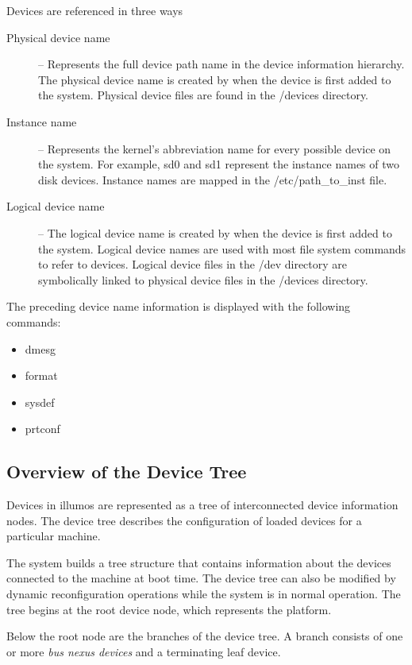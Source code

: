 \documentclass[11pt]{article}
\begin{document}
Devices are referenced in three ways

\begin{description}
\item [Physical device name] -- Represents the full device path name in the
  device information hierarchy. The physical device name is created by when the
  device is first added to the system. Physical device files are found in the
  /devices directory.

\item [Instance name] -- Represents the kernel's abbreviation name for every
  possible device on the system. For example, sd0 and sd1 represent the instance
  names of two disk devices. Instance names are mapped in the
  /etc/path\_to\_inst file.

\item [Logical device name] -- The logical device name is created by when the
  device is first added to the system. Logical device names are used with most
  file system commands to refer to devices. Logical device files in the /dev
  directory are symbolically linked to physical device files in the /devices
  directory.
\end{description}

The preceding device name information is displayed with the following commands:
\begin{itemize}
\item dmesg
\item format
\item sysdef
\item prtconf
\end{itemize}

\subsection*{Overview of the Device Tree}

Devices in illumos are represented as a tree of interconnected device
information nodes. The device tree describes the configuration of loaded devices
for a particular machine.

The system builds a tree structure that contains information about the devices
connected to the machine at boot time. The device tree can also be modified by
dynamic reconfiguration operations while the system is in normal operation. The
tree begins at the root device node, which represents the platform.

Below the root node are the branches of the device tree. A branch consists of
one or more {\it bus nexus devices} and a terminating leaf device.
\end{document}
